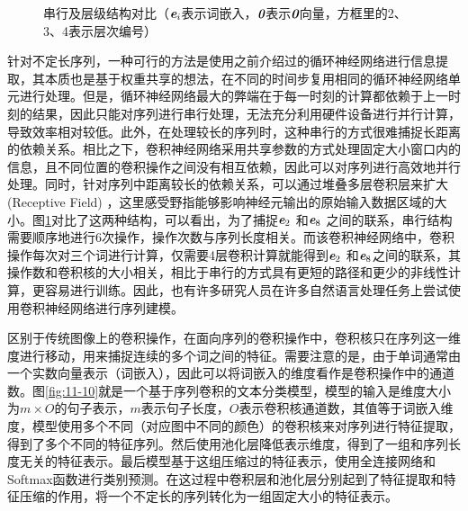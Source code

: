 \begin{figure}[htp]
\centering
%
\caption{串行及层级结构对比（$\textbf{\em e}_i$表示词嵌入，$\textbf{\em 0}$表示$\textbf{\em 0}$向量，方框里的2、3、4表示层次编号）}
\label{fig:11-9}
\end{figure}
\vspace{-1em}
\parinterval 针对不定长序列，一种可行的方法是使用之前介绍过的循环神经网络进行信息提取，其本质也是基于权重共享的想法，在不同的时间步复用相同的循环神经网络单元进行处理。但是，循环神经网络最大的弊端在于每一时刻的计算都依赖于上一时刻的结果，因此只能对序列进行串行处理，无法充分利用硬件设备进行并行计算，导致效率相对较低。此外，在处理较长的序列时，这种串行的方式很难捕捉长距离的依赖关系。相比之下，卷积神经网络采用共享参数的方式处理固定大小窗口内的信息，且不同位置的卷积操作之间没有相互依赖，因此可以对序列进行高效地并行处理。同时，针对序列中距离较长的依赖关系，可以通过堆叠多层卷积层来扩大{\small{}} (Receptive Field)  ，这里感受野指能够影响神经元输出的原始输入数据区域的大小。图\ref{fig:11-9}对比了这两种结构，可以看出，为了捕捉$\textbf{\em e}_2$ 和$\textbf{\em e}_8$ 之间的联系，串行结构需要顺序地进行6次操作，操作次数与序列长度相关。而该卷积神经网络中，卷积操作每次对三个词进行计算，仅需要4层卷积计算就能得到$\textbf{\em e}_2$ 和$\textbf{\em e}_8$之间的联系，其操作数和卷积核的大小相关，相比于串行的方式具有更短的路径和更少的非线性计算，更容易进行训练。因此，也有许多研究人员在许多自然语言处理任务上尝试使用卷积神经网络进行序列建模。

\parinterval 区别于传统图像上的卷积操作，在面向序列的卷积操作中，卷积核只在序列这一维度进行移动，用来捕捉连续的多个词之间的特征。需要注意的是，由于单词通常由一个实数向量表示（词嵌入），因此可以将词嵌入的维度看作是卷积操作中的通道数。图\ref{fig:11-10}就是一个基于序列卷积的文本分类模型，模型的输入是维度大小为$m\times O $的句子表示，$m$表示句子长度，$O$表示卷积核通道数，其值等于词嵌入维度，模型使用多个不同（对应图中不同的颜色）的卷积核来对序列进行特征提取，得到了多个不同的特征序列。然后使用池化层降低表示维度，得到了一组和序列长度无关的特征表示。最后模型基于这组压缩过的特征表示，使用全连接网络和Softmax函数进行类别预测。在这过程中卷积层和池化层分别起到了特征提取和特征压缩的作用，将一个不定长的序列转化为一组固定大小的特征表示。

